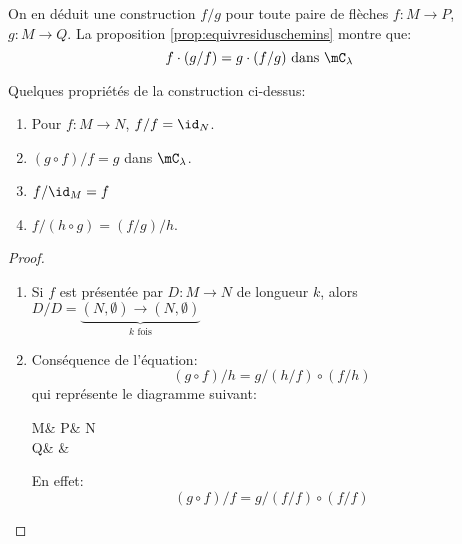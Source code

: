 \documentclass[math, info]{cours}
\begin{document}
On en déduit une construction $f/g$ pour toute paire de flèches $f: M \to P$, $g: M\to Q$.
La proposition \ref{prop:equivresiduschemins} montre que:
\begin{equation*}
	f \cdot (g/f) = g\cdot (f/g) \text{ dans } \clam
\end{equation*}
\begin{proposition}
	Quelques propriétés de la construction ci-dessus:
	\begin{enumerate}
		\item Pour $f: M \to N$, $f / f = \id_{N}$.
		\item $(g \circ f) / f = g$ dans $\clam$.
		\item $f / \id_{M} = f$
		\item $f / (h\circ g) = (f / g) / h$.
	\end{enumerate}
	\label{prop:proprieteresidufleche}
\end{proposition}
\begin{proof}
	\begin{enumerate}
		\item Si $f$ est présentée par $D : M \to N$ de longueur $k$, alors $D / D = \underbrace{(N, \emptyset)\to (N, \emptyset)}_{k \text{ fois}}$
		\item Conséquence de l'équation:
			\begin{equation*}
				(g \circ f) / h = g / (h / f) \circ (f/h)
			\end{equation*}
			qui représente le diagramme suivant:
			\begin{category}
				M\ar[d, "h"]\ar[r, "f"] & P\ar[d, "h/f"]\ar[r, "g"] & N\ar[d]\\
				Q\ar[r, "f/h"'] & \phantom{}\ar[r, "g / (h/f)"'] & \phantom{}
			\end{category}
			En effet:
			\begin{equation*}
				(g \circ f) / f = g / (f / f) \circ (f / f)
			\end{equation*}
	\end{enumerate}
\end{proof}
\end{document}
